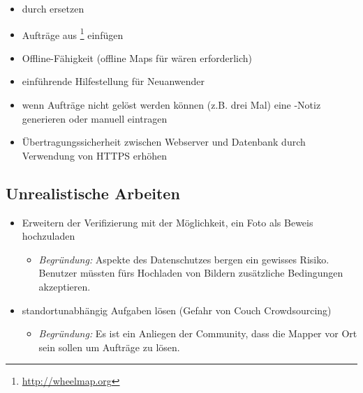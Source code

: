 \begin{itemize}
	\item {} durch  ersetzen
	\item Aufträge aus \footnote{\url{http://wheelmap.org}}	 einfügen
	\item Offline-Fähigkeit (offline Maps für  wären erforderlich)
	\item einführende Hilfestellung für Neuanwender
	\item wenn Aufträge nicht gelöst werden können (z.B. drei Mal) eine -Notiz generieren oder manuell eintragen
	\item Übertragungssicherheit zwischen Webserver und Datenbank durch Verwendung von HTTPS erhöhen
\end{itemize}

\subsection{Unrealistische Arbeiten}
\begin{itemize}
	\item Erweitern der Verifizierung mit der Möglichkeit, ein Foto als Beweis hochzuladen
	\begin{itemize}
	  \item \emph{Begründung:} Aspekte des Datenschutzes bergen ein gewisses Risiko. Benutzer müssten fürs Hochladen von Bildern zusätzliche Bedingungen akzeptieren.
	\end{itemize}
	\item standortunabhängig Aufgaben lösen (Gefahr von Couch Crowdsourcing)
	\begin{itemize}
	  \item \emph{Begründung:} Es ist ein Anliegen der  Community, dass die Mapper vor Ort sein sollen um Aufträge zu lösen. 
	\end{itemize}
\end{itemize}
